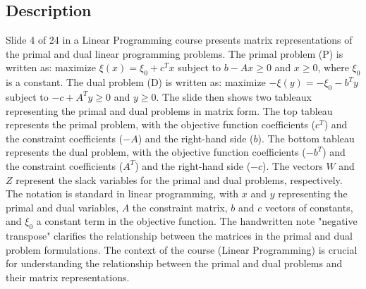 \documentclass{article}%
\begin{document}
\subsection{Description}%
Slide 4 of 24 in a Linear Programming course presents matrix representations of the primal and dual linear programming problems. The primal problem (P) is written as: maximize $\xi(x) = \xi_0 + c^Tx$ subject to $b - Ax \ge 0$ and $x \ge 0$, where $\xi_0$ is a constant. The dual problem (D) is written as: maximize $-\xi(y) = -\xi_0 - b^Ty$ subject to $-c + A^Ty \ge 0$ and $y \ge 0$. The slide then shows two tableaux representing the primal and dual problems in matrix form. The top tableau represents the primal problem, with the objective function coefficients ($c^T$) and the constraint coefficients ($-A$) and the right-hand side ($b$). The bottom tableau represents the dual problem, with the objective function coefficients ($-b^T$) and the constraint coefficients ($A^T$) and the right-hand side ($-c$). The vectors $W$ and $Z$ represent the slack variables for the primal and dual problems, respectively. The notation is standard in linear programming, with $x$ and $y$ representing the primal and dual variables, $A$ the constraint matrix, $b$ and $c$ vectors of constants, and $\xi_0$ a constant term in the objective function.  The handwritten note "negative transpose" clarifies the relationship between the matrices in the primal and dual problem formulations. The context of the course (Linear Programming) is crucial for understanding the relationship between the primal and dual problems and their matrix representations.%
\end{document}
